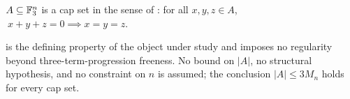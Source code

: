 \begin{assumption}\label{ass:capset}
$A\subseteq\mathbb{F}_3^n$ is a cap set in the sense of : for all
$x,y,z\in A$, $\ x+y+z=0\implies x=y=z$.
\end{assumption}

\begin{remark}[Mildness]\label{rem:ass-mild}
 is the defining property of the object under study and imposes no
regularity beyond three-term-progression freeness. No bound on $|A|$, no structural
hypothesis, and no constraint on $n$ is assumed; the conclusion $|A|\le 3M_n$ holds
for every cap set.
\end{remark}
